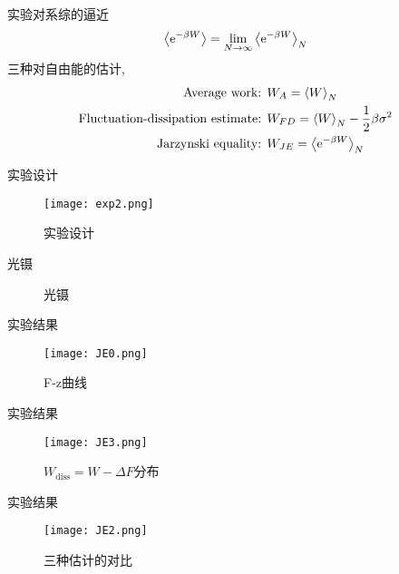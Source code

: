     \begin{frame}{实验对系综的逼近}
        \begin{equation}
                \expval{\mathrm{e}^{-\beta W}} = \lim_{N\to\infty} \expval{\mathrm{e}^{-\beta W}}_N 
        \end{equation}
        三种对自由能的估计,
        \begin{equation}
            \begin{split}
                \text{Average work: } & W_A = \expval{W}_N\\
                \text{Fluctuation-dissipation estimate: } & W_{FD} = \expval{W}_N - \frac12\beta\sigma^2\\
                \text{Jarzynski equality: } & W_{JE} = \expval{\mathrm{e}^{-\beta W}}_N
            \end{split}
        \end{equation}
    \end{frame}
    \begin{frame}{实验设计}
            \begin{figure}
                \centering
                \texttt{[image: exp2.png]}
                \caption{实验设计}
            \end{figure}
    \end{frame}
    \begin{frame}{光镊}
        \begin{figure}
            \centering
            \caption{光镊}
        \end{figure}
    \end{frame}
    \begin{frame}{实验结果}
        \begin{figure}
            \centering
            \texttt{[image: JE0.png]}
            \caption{F-z曲线}
        \end{figure}
    \end{frame}
    \begin{frame}{实验结果}
        \begin{figure}
            \centering
            \texttt{[image: JE3.png]}
            \caption{$W_{\text{diss}} = W - \Delta F$分布}
        \end{figure}
    \end{frame}
    \begin{frame}{实验结果}
        \begin{figure}
            \centering
            \texttt{[image: JE2.png]}
            \caption{三种估计的对比}
        \end{figure}
    \end{frame}
